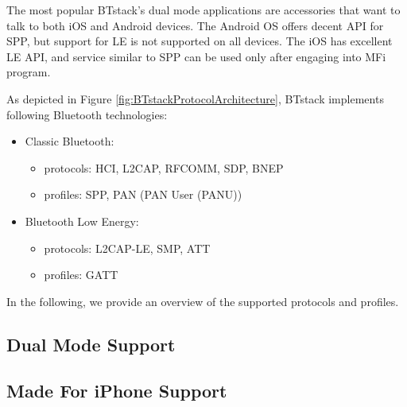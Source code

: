 The most popular BTstack's dual mode applications are accessories that want to talk to both iOS and Android devices. The Android OS offers decent API for SPP, but support for LE is not supported on all devices. The iOS has excellent LE API, and service similar to SPP can be used only after engaging into MFi program.

As depicted in Figure \ref{fig:BTstackProtocolArchitecture}, BTstack implements following Bluetooth technologies:
\begin{itemize}
\item Classic Bluetooth:
	\begin{itemize}
	\item protocols: HCI, L2CAP, RFCOMM, SDP, BNEP
	\item profiles: SPP, PAN (PAN User (PANU))
	\end{itemize}
\item Bluetooth Low Energy:
	\begin{itemize}
	\item protocols: L2CAP-LE, SMP, ATT
	\item profiles: GATT
	\end{itemize}
\end{itemize}

In the following, we provide an overview of the supported protocols and profiles.




\subsection{Dual Mode Support}
\subsection{Made For iPhone Support}


